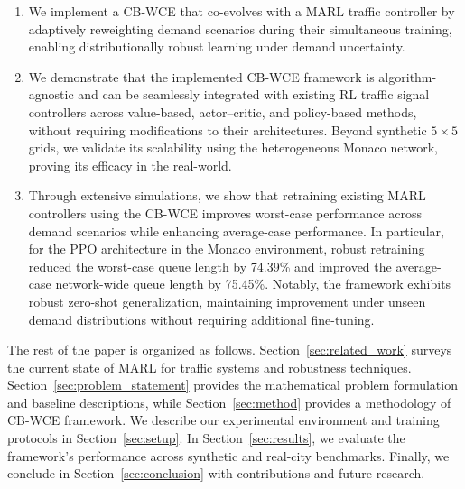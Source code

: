 \documentclass[lettersize,journal]{IEEEtran}
\begin{document}
\begin{enumerate}
    \item We implement a CB-WCE that co-evolves with a MARL traffic controller by adaptively reweighting demand scenarios during their simultaneous training, enabling distributionally robust learning under demand uncertainty.

    \item We demonstrate that the implemented CB-WCE framework is algorithm-agnostic and can be seamlessly integrated with existing RL traffic signal controllers across value-based, actor–critic, and policy-based methods, without requiring modifications to their architectures. Beyond synthetic $5 \times 5$ grids, we validate its scalability using the heterogeneous Monaco network, proving its efficacy in the real-world.
    \item Through extensive simulations, we show that retraining existing MARL controllers using the CB-WCE improves worst-case performance across demand scenarios while enhancing average-case performance. In particular, for the PPO architecture in the Monaco environment, robust retraining reduced the worst-case queue length by 74.39\% and improved the average-case network-wide queue length by 75.45\%. Notably, the framework exhibits robust zero-shot generalization, maintaining improvement under unseen demand distributions without requiring additional fine-tuning.



\end{enumerate}


The rest of the paper is organized as follows. Section~\ref{sec:related_work} surveys the current state of MARL for traffic systems and robustness techniques. Section~\ref{sec:problem_statement} provides the mathematical problem formulation and baseline descriptions, while Section~\ref{sec:method} provides a methodology of CB-WCE framework. We describe our experimental environment and training protocols in Section~\ref{sec:setup}. In Section~\ref{sec:results}, we evaluate the framework’s performance across synthetic and real-city benchmarks. Finally, we conclude in Section~\ref{sec:conclusion} with contributions and future research. 

\end{document}

